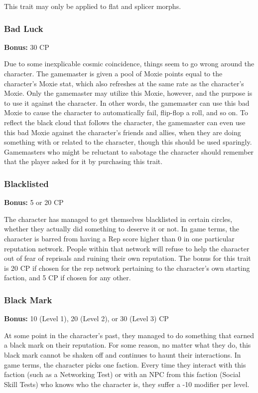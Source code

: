 This trait may only be applied to flat and splicer morphs.

\subsubsection{Bad Luck}
\textbf{Bonus:} 30 CP

Due to some inexplicable cosmic coincidence, things seem to go wrong around the
character. The gamemaster is given a pool of Moxie points equal to the
character’s Moxie stat, which also refreshes at the same rate as the
character’s Moxie. Only the gamemaster may utilize this Moxie, however, and the
purpose is to use it against the character. In other words, the gamemaster can
use this bad Moxie to cause the character to automatically fail, flip-flop a
roll, and so on. To reflect the black cloud that follows the character, the
gamemaster can even use this bad Moxie against the character’s friends and
allies, when they are doing something with or related to the character, though
this should be used sparingly.  Gamemasters who might be reluctant to sabotage
the character should remember that the player asked for it by purchasing this
trait.

\subsubsection{Blacklisted}
\textbf{Bonus:} 5 or 20 CP

The character has managed to get themselves blacklisted in certain circles,
whether they actually did something to deserve it or not. In game terms, the
character is barred from having a Rep score higher than 0 in one particular
reputation network. People within that network will refuse to help the
character out of fear of reprisals and ruining their own reputation. The
bonus for this trait is 20 CP if chosen for the rep network pertaining to the
character’s own starting faction, and 5 CP if chosen for any other.

\subsubsection{Black Mark}
\textbf{Bonus:} 10 (Level 1), 20 (Level 2), or 30 (Level 3) CP

At some point in the character’s past, they managed to do something that earned
a black mark on their reputation. For some reason, no matter what they do, this
black mark cannot be shaken off and continues to haunt their interactions. In
game terms, the character picks one faction. Every time they interact with this
faction (such as a Networking Test) or with an NPC from this faction (Social
Skill Tests) who knows who the character is, they suffer a -10 modifier per
level.


